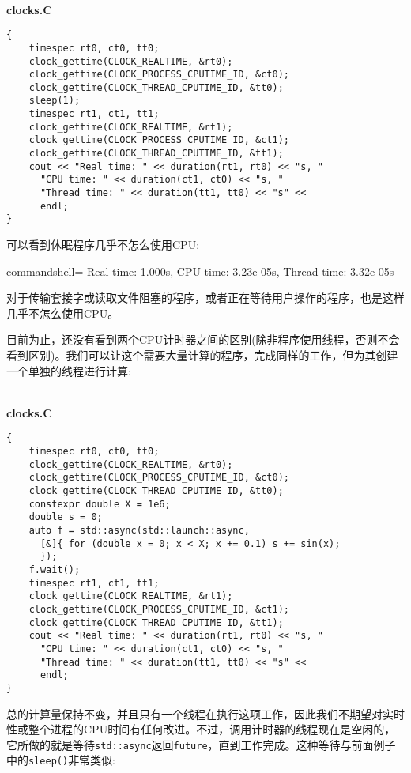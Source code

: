 \hspace*{\fill} \\ %
\noindent
\textbf{clocks.C}
\begin{lstlisting}[style=styleCXX]
{
	timespec rt0, ct0, tt0;
	clock_gettime(CLOCK_REALTIME, &rt0);
	clock_gettime(CLOCK_PROCESS_CPUTIME_ID, &ct0);
	clock_gettime(CLOCK_THREAD_CPUTIME_ID, &tt0);
	sleep(1);
	timespec rt1, ct1, tt1;
	clock_gettime(CLOCK_REALTIME, &rt1);
	clock_gettime(CLOCK_PROCESS_CPUTIME_ID, &ct1);
	clock_gettime(CLOCK_THREAD_CPUTIME_ID, &tt1);
	cout << "Real time: " << duration(rt1, rt0) << "s, "
	  "CPU time: " << duration(ct1, ct0) << "s, "
	  "Thread time: " << duration(tt1, tt0) << "s" <<
  	  endl;
}
\end{lstlisting}

可以看到休眠程序几乎不怎么使用CPU:

\begin{tcblisting}{commandshell={}}
Real time: 1.000s, CPU time: 3.23e-05s, Thread time: 3.32e-05s
\end{tcblisting}

对于传输套接字或读取文件阻塞的程序，或者正在等待用户操作的程序，也是这样几乎不怎么使用CPU。

目前为止，还没有看到两个CPU计时器之间的区别(除非程序使用线程，否则不会看到区别)。我们可以让这个需要大量计算的程序，完成同样的工作，但为其创建一个单独的线程进行计算:

\hspace*{\fill} \\ %
\noindent
\textbf{clocks.C}
\begin{lstlisting}[style=styleCXX]
{
	timespec rt0, ct0, tt0;
	clock_gettime(CLOCK_REALTIME, &rt0);
	clock_gettime(CLOCK_PROCESS_CPUTIME_ID, &ct0);
	clock_gettime(CLOCK_THREAD_CPUTIME_ID, &tt0);
	constexpr double X = 1e6;
	double s = 0;
	auto f = std::async(std::launch::async,
	  [&]{ for (double x = 0; x < X; x += 0.1) s += sin(x);
	  });
	f.wait();
	timespec rt1, ct1, tt1;
	clock_gettime(CLOCK_REALTIME, &rt1);
	clock_gettime(CLOCK_PROCESS_CPUTIME_ID, &ct1);
	clock_gettime(CLOCK_THREAD_CPUTIME_ID, &tt1);
	cout << "Real time: " << duration(rt1, rt0) << "s, "
	  "CPU time: " << duration(ct1, ct0) << "s, "
	  "Thread time: " << duration(tt1, tt0) << "s" <<
	  endl;
}
\end{lstlisting}

总的计算量保持不变，并且只有一个线程在执行这项工作，因此我们不期望对实时性或整个进程的CPU时间有任何改进。不过，调用计时器的线程现在是空闲的，它所做的就是等待\texttt{std::async}返回\texttt{future}，直到工作完成。这种等待与前面例子中的\texttt{sleep()}非常类似:

